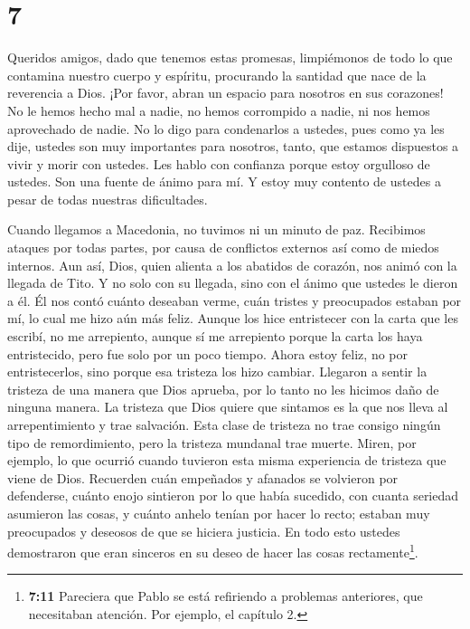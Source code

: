 \hypertarget{section-6}{%
\section{7}\label{section-6}}

 Queridos amigos, dado que tenemos estas promesas,
limpiémonos de todo lo que contamina nuestro cuerpo y espíritu,
procurando la santidad que nace de la reverencia a Dios. 
¡Por favor, abran un espacio para nosotros en sus corazones! No le hemos
hecho mal a nadie, no hemos corrompido a nadie, ni nos hemos aprovechado
de nadie.  No lo digo para condenarlos a ustedes, pues como
ya les dije, ustedes son muy importantes para nosotros, tanto, que
estamos dispuestos a vivir y morir con ustedes.  Les hablo
con confianza porque estoy orgulloso de ustedes. Son una fuente de ánimo
para mí. Y estoy muy contento de ustedes a pesar de todas nuestras
dificultades.

 Cuando llegamos a Macedonia, no tuvimos ni un minuto de
paz. Recibimos ataques por todas partes, por causa de conflictos
externos así como de miedos internos.  Aun así, Dios, quien
alienta a los abatidos de corazón, nos animó con la llegada de Tito.
 Y no solo con su llegada, sino con el ánimo que ustedes le
dieron a él. Él nos contó cuánto deseaban verme, cuán tristes y
preocupados estaban por mí, lo cual me hizo aún más feliz. 
Aunque los hice entristecer con la carta que les escribí, no me
arrepiento, aunque sí me arrepiento porque la carta los haya
entristecido, pero fue solo por un poco tiempo.  Ahora estoy
feliz, no por entristecerlos, sino porque esa tristeza los hizo cambiar.
Llegaron a sentir la tristeza de una manera que Dios aprueba, por lo
tanto no les hicimos daño de ninguna manera.  La tristeza
que Dios quiere que sintamos es la que nos lleva al arrepentimiento y
trae salvación. Esta clase de tristeza no trae consigo ningún tipo de
remordimiento, pero la tristeza mundanal trae muerte. 
Miren, por ejemplo, lo que ocurrió cuando tuvieron esta misma
experiencia de tristeza que viene de Dios. Recuerden cuán empeñados y
afanados se volvieron por defenderse, cuánto enojo sintieron por lo que
había sucedido, con cuanta seriedad asumieron las cosas, y cuánto anhelo
tenían por hacer lo recto; estaban muy preocupados y deseosos de que se
hiciera justicia. En todo esto ustedes demostraron que eran sinceros en
su deseo de hacer las cosas rectamente\footnote{\textbf{7:11} Pareciera
  que Pablo se está refiriendo a problemas anteriores, que necesitaban
  atención. Por ejemplo, el capítulo 2.}.


